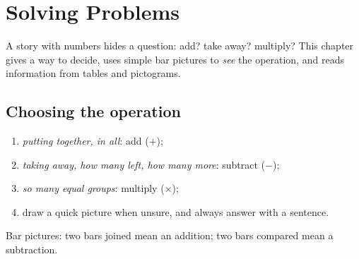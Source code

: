 \chapter{Solving Problems}\label{ch:g2:problems}

A story with numbers hides a question: add? take away? multiply?
This chapter gives a way to decide, uses simple bar pictures to
\emph{see} the operation, and reads information from tables and
pictograms.

\section{Choosing the operation}

\begin{method}\label{met:g2:problems:choose}
\begin{enumerate}
  \item \emph{putting together, in all}: add ($+$);
  \item \emph{taking away, how many left, how many more}: subtract
        ($-$);
  \item \emph{so many equal groups}: multiply ($\times$);
  \item draw a quick picture when unsure, and always answer with a
        sentence.
\end{enumerate}
\end{method}

\begin{omfigure}

{\small Bar pictures: two bars joined mean an addition; two bars
compared mean a subtraction.}
\end{omfigure}

